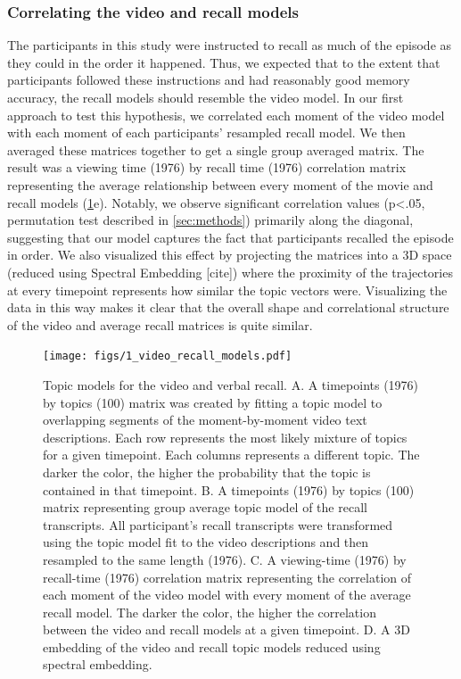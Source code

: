 \documentclass[a4paper,man,natbib,floatsintext]{apa6}
\begin{document}
\subsubsection{Correlating the video and recall models}
The participants in this study were instructed to recall as much of the episode as they could in the order it happened.  Thus, we expected that to the extent that participants followed these instructions and had reasonably good memory accuracy, the recall models should resemble the video model. In our first approach to test this hypothesis, we correlated each moment of the video model with each moment of each participants' resampled recall model. We then averaged these matrices together to get a single group averaged matrix.  The result was a viewing time (1976) by recall time (1976) correlation matrix representing the average relationship between every moment of the movie and recall models (\ref{fig:model}e). Notably, we observe significant correlation values (p<.05, permutation test described in \ref{sec:methods}) primarily along the diagonal, suggesting that our model captures the fact that participants recalled the episode in order. We also visualized this effect by projecting the matrices into a 3D space (reduced using Spectral Embedding [cite]) where the proximity of the trajectories at every timepoint represents how similar the topic vectors were. Visualizing the data in this way makes it clear that the overall shape and correlational structure of the video and average recall matrices is quite similar.

\begin{figure}[t!]
\centering
\texttt{[image: figs/1\_video\_recall\_models.pdf]}
\caption{\label{fig:model}Topic models for the video and verbal recall. A. A timepoints (1976) by topics (100) matrix was created by fitting a topic model to overlapping segments of the moment-by-moment video text descriptions.  Each row represents the most likely mixture of topics for a given timepoint. Each columns represents a different topic. The darker the color, the higher the probability that the topic is contained in that timepoint. B. A timepoints (1976) by topics (100) matrix representing group average topic model of the recall transcripts.  All participant's recall transcripts were transformed using the topic model fit to the video descriptions and then resampled to the same length (1976). C. A viewing-time (1976) by recall-time (1976) correlation matrix representing the correlation of each moment of the video model with every moment of the average recall model. The darker the color, the higher the correlation between the video and recall models at a given timepoint. D. A 3D embedding of the video and recall topic models reduced using spectral embedding. }
\end{figure}
\end{document}
